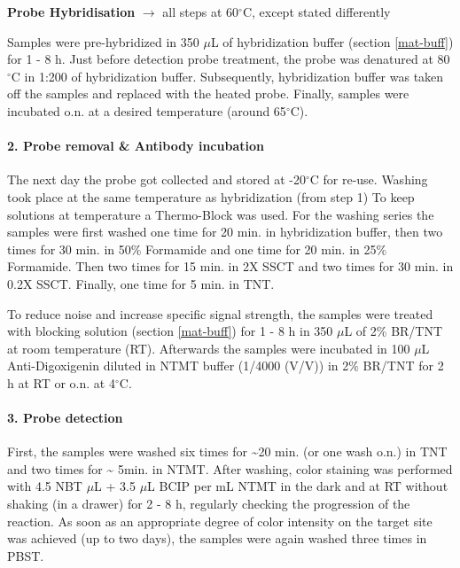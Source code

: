 \documentclass[10pt, b5paper, singlespacinge, twoside]{reedthesis} %
\theoremstyle{definition}
\theoremstyle{definition}
\theoremstyle{definition}
\theoremstyle{remark}
\begin{document}
\textbf{Probe Hybridisation} \(\rightarrow\) all steps at 60\(^\circ\)C, except stated differently \newline

Samples were pre-hybridized in 350 \(\mu\)L of hybridization buffer (section \ref{mat-buff}) for 1 - 8 h. Just before detection probe treatment, the probe was denatured at 80\(^\circ\)C in 1:200 of hybridization buffer. Subsequently, hybridization buffer was taken off the samples and replaced with the heated probe. Finally, samples were incubated o.n. at a desired temperature (around 65\(^\circ\)C).

\hypertarget{probe-removal-antibody-incubation}{%
\paragraph{2. Probe removal \& Antibody incubation}\label{probe-removal-antibody-incubation}}

The next day the probe got collected and stored at -20\(^\circ\)C for re-use. Washing took place at the same temperature as hybridization (from step 1) To keep solutions at temperature a Thermo-Block was used. For the washing series the samples were first washed one time for 20 min. in hybridization buffer, then two times for 30 min. in 50\(\%\) Formamide and one time for 20 min. in 25\(\%\) Formamide. Then two times for 15 min. in 2X SSCT and two times for 30 min. in 0.2X SSCT. Finally, one time for 5 min. in TNT.

To reduce noise and increase specific signal strength, the samples were treated with blocking solution (section \ref{mat-buff}) for 1 - 8 h in 350 \(\mu\)L of 2\% BR/TNT at room temperature (RT). Afterwards the samples were incubated in 100 \(\mu\)L Anti-Digoxigenin diluted in NTMT buffer (1/4000 (V/V)) in 2\(\%\) BR/TNT for 2 h at RT or o.n. at 4\(^\circ\)C.

\hypertarget{probe-detection}{%
\paragraph{3. Probe detection}\label{probe-detection}}

First, the samples were washed six times for \textasciitilde20 min. (or one wash o.n.) in TNT and two times for \textasciitilde{} 5min. in NTMT. After washing, color staining was performed with 4.5 NBT \(\mu\)L + 3.5 \(\mu\)L BCIP per mL NTMT in the dark and at RT without shaking (in a drawer) for 2 - 8 h, regularly checking the progression of the reaction. As soon as an appropriate degree of color intensity on the target site was achieved (up to two days), the samples were again washed three times in PBST.
\end{document}
